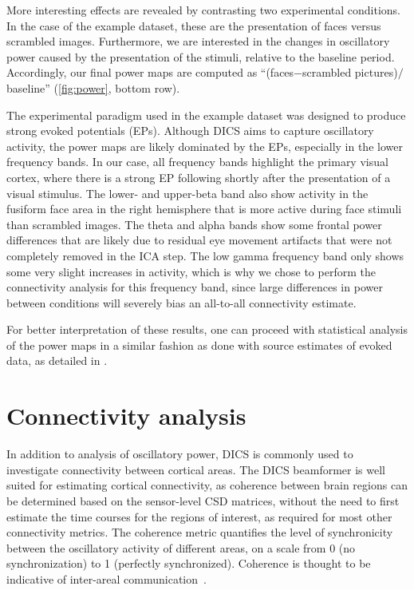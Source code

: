 \documentclass[utf8]{frontiersSCNS}
\renewcommand{\cite}[1]{~\citep{#1}}
\newcommand{\textcite}[1]{\citet{#1}}
\begin{document}
More interesting effects are revealed by contrasting two experimental conditions.
In the case of the example dataset, these are the presentation of faces versus scrambled images.
Furthermore, we are interested in the changes in oscillatory power caused by the presentation of the stimuli, relative to the baseline period.
Accordingly, our final power maps are computed as ``(faces$-$scrambled pictures)$/$baseline'' (\autoref{fig:power}, bottom row).

The experimental paradigm used in the example dataset was designed to produce strong evoked potentials (EPs).
Although DICS aims to capture oscillatory activity, the power maps are likely dominated by the EPs, especially in the lower frequency bands.
In our case, all frequency bands highlight the primary visual cortex, where there is a strong EP following shortly after the presentation of a visual stimulus.
The lower- and upper-beta band also show activity in the fusiform face area in the right hemisphere that is more active during face stimuli than scrambled images.
The theta and alpha bands show some frontal power differences that are likely due to residual eye movement artifacts that were not completely removed in the ICA step.
The low gamma frequency band only shows some very slight increases in activity, which is why we chose to perform the connectivity analysis for this frequency band, since large differences in power between conditions will severely bias an all-to-all connectivity estimate.

For better interpretation of these results, one can proceed with statistical analysis of the power maps in a similar fashion as done with source estimates of evoked data, as detailed in \textcite{Jas2017}.


\section{Connectivity analysis}\label{connectivity}

In addition to analysis of oscillatory power, DICS is commonly used to investigate connectivity between cortical areas.
The DICS beamformer is well suited for estimating cortical connectivity, as coherence between brain regions can be determined based on the sensor-level CSD matrices, without the need to first estimate the time courses for the regions of interest, as required for most other connectivity metrics.
The coherence metric quantifies the level of synchronicity between the oscillatory activity of different areas, on a scale from 0 (no synchronization) to 1 (perfectly synchronized).
Coherence is thought to be indicative of inter-areal communication\cite{Fries2005}.
\end{document}
